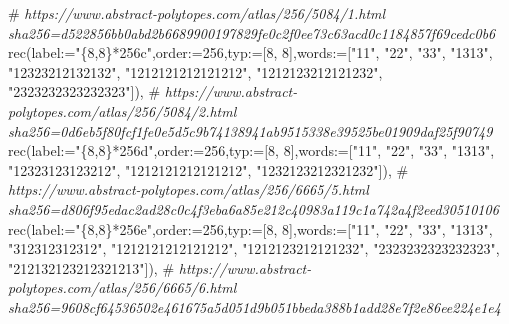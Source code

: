 \documentclass[
  10pt,
  letterpaper,
]{article}
\newenvironment{Shaded}{}{}
\newcommand{\CommentTok}[1]{\textcolor[rgb]{0.38,0.63,0.69}{\textit{#1}}}
\newcommand{\ExtensionTok}[1]{#1}
\newcommand{\FloatTok}[1]{\textcolor[rgb]{0.25,0.63,0.44}{#1}}
\newcommand{\NormalTok}[1]{#1}
\newcommand{\OperatorTok}[1]{\textcolor[rgb]{0.40,0.40,0.40}{#1}}
\newcommand{\StringTok}[1]{\textcolor[rgb]{0.25,0.44,0.63}{#1}}
\newcommand{\VariableTok}[1]{\textcolor[rgb]{0.10,0.09,0.49}{#1}}
\begin{document}
\begin{Shaded}
\begin{Highlighting}[]
\NormalTok{\#}\CommentTok{ https://www.abstract{-}polytopes.com/atlas/256/5084/1.html sha256=d522856bb0abd2b6689900197829fe0c2f0ee73c63acd0c1184857f69cedc0b6}
\ExtensionTok{rec}\NormalTok{(}\VariableTok{label}\OperatorTok{:=}\StringTok{"\{8,8\}*256c"}\OperatorTok{,}\VariableTok{order}\OperatorTok{:=}\FloatTok{256}\OperatorTok{,}\VariableTok{typ}\OperatorTok{:=}\NormalTok{[}\FloatTok{8}\OperatorTok{,} \FloatTok{8}\NormalTok{]}\OperatorTok{,}\VariableTok{words}\OperatorTok{:=}\NormalTok{[}\StringTok{"11"}\OperatorTok{,} \StringTok{"22"}\OperatorTok{,} \StringTok{"33"}\OperatorTok{,} \StringTok{"1313"}\OperatorTok{,} \StringTok{"12323212132132"}\OperatorTok{,} \StringTok{"1212121212121212"}\OperatorTok{,} \StringTok{"1212123212121232"}\OperatorTok{,} \StringTok{"2323232323232323"}\NormalTok{])}\OperatorTok{,}
\NormalTok{\#}\CommentTok{ https://www.abstract{-}polytopes.com/atlas/256/5084/2.html sha256=0d6eb5f80fcf1fe0e5d5c9b74138941ab9515338e39525be01909daf25f90749}
\ExtensionTok{rec}\NormalTok{(}\VariableTok{label}\OperatorTok{:=}\StringTok{"\{8,8\}*256d"}\OperatorTok{,}\VariableTok{order}\OperatorTok{:=}\FloatTok{256}\OperatorTok{,}\VariableTok{typ}\OperatorTok{:=}\NormalTok{[}\FloatTok{8}\OperatorTok{,} \FloatTok{8}\NormalTok{]}\OperatorTok{,}\VariableTok{words}\OperatorTok{:=}\NormalTok{[}\StringTok{"11"}\OperatorTok{,} \StringTok{"22"}\OperatorTok{,} \StringTok{"33"}\OperatorTok{,} \StringTok{"1313"}\OperatorTok{,} \StringTok{"12323123123212"}\OperatorTok{,} \StringTok{"1212121212121212"}\OperatorTok{,} \StringTok{"1232123212321232"}\NormalTok{])}\OperatorTok{,}
\NormalTok{\#}\CommentTok{ https://www.abstract{-}polytopes.com/atlas/256/6665/5.html sha256=d806f95edac2ad28c0c4f3eba6a85e212c40983a119c1a742a4f2eed30510106}
\ExtensionTok{rec}\NormalTok{(}\VariableTok{label}\OperatorTok{:=}\StringTok{"\{8,8\}*256e"}\OperatorTok{,}\VariableTok{order}\OperatorTok{:=}\FloatTok{256}\OperatorTok{,}\VariableTok{typ}\OperatorTok{:=}\NormalTok{[}\FloatTok{8}\OperatorTok{,} \FloatTok{8}\NormalTok{]}\OperatorTok{,}\VariableTok{words}\OperatorTok{:=}\NormalTok{[}\StringTok{"11"}\OperatorTok{,} \StringTok{"22"}\OperatorTok{,} \StringTok{"33"}\OperatorTok{,} \StringTok{"1313"}\OperatorTok{,} \StringTok{"312312312312"}\OperatorTok{,} \StringTok{"1212121212121212"}\OperatorTok{,} \StringTok{"1212123212121232"}\OperatorTok{,} \StringTok{"2323232323232323"}\OperatorTok{,} \StringTok{"212132123212321213"}\NormalTok{])}\OperatorTok{,}
\NormalTok{\#}\CommentTok{ https://www.abstract{-}polytopes.com/atlas/256/6665/6.html sha256=9608cf64536502e461675a5d051d9b051bbeda388b1add28e7f2e86ee224e1e4}

\end{Highlighting}
\end{Shaded}
\end{document}
